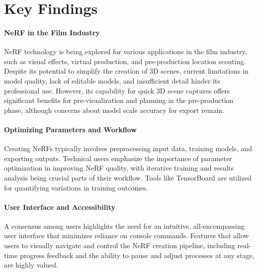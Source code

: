 \section{Key Findings}
\label{sec:user-research:findings}


\paragraph{NeRF in the Film Industry}
NeRF technology is being explored for various applications in the film industry, such as visual effects, virtual production, and pre-production location scouting. 
Despite its potential to simplify the creation of 3D scenes, current limitations in model quality, lack of editable models, and insufficient detail hinder its professional use. 
However, its capability for quick 3D scene captures offers significant benefits for pre-visualization and planning in the pre-production phase, although concerns about model scale accuracy for export remain. 
\cite{P2, P4}


\paragraph{Optimizing Parameters and Workflow}
Creating NeRFs typically involves preprocessing input data, training models, and exporting outputs. 
Technical users emphasize the importance of parameter optimization in improving NeRF quality, with iterative training and results analysis being crucial parts of their workflow.
Tools like TensorBoard \cite{noauthor_tensorflowtensorboard_2024} are utilized for quantifying variations in training outcomes. 
\cite{P1, P3}


\paragraph{User Interface and Accessibility}
A consensus among users highlights the need for an intuitive, all-encompassing user interface that minimizes reliance on console commands. 
Features that allow users to visually navigate and control the NeRF creation pipeline, including real-time progress feedback and the ability to pause and adjust processes at any stage, are highly valued. 
\cite{P1, P2, P3}

